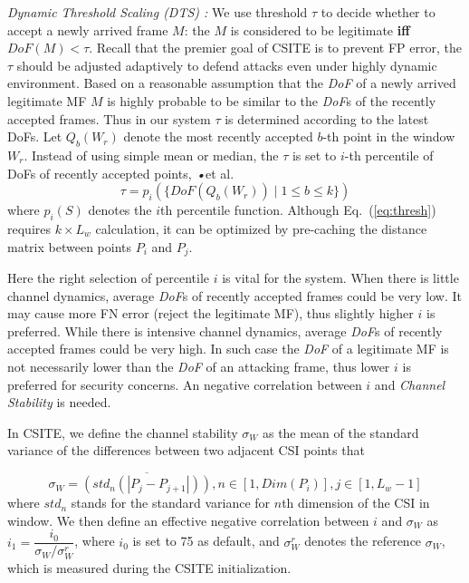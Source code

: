 \documentclass[conference]{IEEEtran}
\newcommand{\eqqref}[1]{Eq.~(\ref{#1})}
\def\ie{\textit{•}{et al.}\xspace}
\begin{document}
\textit{Dynamic Threshold Scaling (DTS) :}
We use threshold $\tau$ to
 decide whether to accept a newly arrived frame $M$:
 the $M$ is considered to be legitimate \textbf{iff} $DoF(M)< \tau$.
Recall that the premier goal of CSITE is to
 prevent FP error, the $\tau$ should be adjusted adaptively  to defend attacks
 even under highly dynamic environment.
 Based on a reasonable assumption that the \textit{DoF} of a newly arrived legitimate MF $M$ is highly probable to be similar to the \textit{DoF}s of the recently accepted frames.
 Thus in our system $\tau$ is determined according to the latest DoFs.
 Let $Q_b(W_r)$ denote the most recently accepted $b$-th point in the
 window $W_r$.
Instead of using simple mean or median,
 the $\tau$ is set to $i$-th percentile of DoFs of recently accepted
  points, \ie
\begin{equation}
\tau = p_i(\{DoF(Q_b(W_r)) \mid 1 \le b \le k \})
\label{eq:thresh}
\end{equation}
where $p_i(S)$ denotes the $i$th percentile function. Although
\eqqref{eq:thresh} requires $k\times L_w$ calculation, it can be
optimized by pre-caching the distance matrix between points $P_i$ and $P_j$.

Here the right selection of percentile $i$ is vital for the system.
When there is little channel dynamics, average \textit{DoF}s of recently accepted frames could be very low. It may cause more FN error (reject the legitimate MF), thus slightly higher $i$ is preferred.
While there is intensive channel dynamics, average \textit{DoF}s of recently accepted frames could be very high. In such case the \textit{DoF} of a legitimate MF is not necessarily lower than the \textit{DoF} of an attacking frame, thus lower $i$ is preferred for security concerns. An negative correlation between $i$ and \emph{Channel Stability} is needed.

In CSITE, we define the channel stability $\sigma_W$ as the mean of the
standard variance of the differences between two adjacent CSI points that

\begin{equation*}
\sigma_W = \overline{(std_n(|P_j - P_{j+1}|))}, n\in[1,Dim(P_i)],j\in [1,L_w-1]
\end{equation*}
where $std_n$ stands for the standard variance for $n$th dimension of
the CSI in window.
We then define an effective negative correlation between $i$ and $\sigma_W$ as
$i_1 = \dfrac{i_0}{\sigma_W / \sigma^r_W}$,
where $i_0$ is set to 75 as default, and $\sigma^r_W$ denotes the
reference $\sigma_W$, which is measured during the CSITE
initialization.
\end{document}
